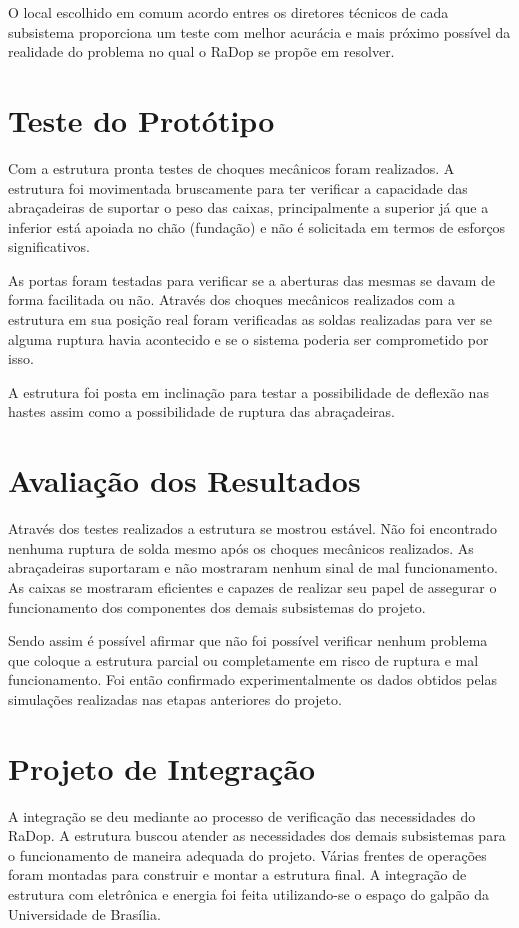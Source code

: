 O local escolhido em comum acordo entres os diretores técnicos de cada subsistema proporciona um teste com melhor acurácia e mais próximo possível da realidade do problema no qual o RaDop se propõe em resolver. 


\section{Teste do Protótipo}

Com a estrutura pronta testes de choques mecânicos foram realizados. A estrutura foi movimentada bruscamente para ter verificar a capacidade das abraçadeiras de suportar o peso das caixas, principalmente a superior já que a inferior está apoiada no chão (fundação) e não é solicitada em termos de esforços significativos.

As portas foram testadas para verificar se a aberturas das mesmas se davam de forma facilitada ou não. Através dos choques mecânicos realizados com a estrutura em sua posição real foram verificadas as soldas realizadas para ver se alguma ruptura havia acontecido e se o sistema poderia ser comprometido por isso.

A estrutura foi posta em inclinação para testar a possibilidade de deflexão nas hastes assim como a possibilidade de ruptura das abraçadeiras.

\section{Avaliação dos Resultados}

Através dos testes realizados a estrutura se mostrou estável. Não foi encontrado nenhuma ruptura de solda mesmo após os choques mecânicos realizados. As abraçadeiras suportaram e não mostraram nenhum sinal de mal funcionamento. As caixas se mostraram eficientes e capazes de realizar seu papel de assegurar o funcionamento dos componentes dos demais subsistemas do projeto.

Sendo assim é possível afirmar que não foi possível verificar nenhum problema que coloque a estrutura parcial ou completamente em risco de ruptura e mal funcionamento. Foi então confirmado experimentalmente os dados obtidos pelas simulações realizadas nas etapas anteriores do projeto.

\section{Projeto de Integração}

A integração se deu mediante ao processo de verificação das necessidades do RaDop. A estrutura buscou atender as necessidades dos demais subsistemas para o funcionamento de maneira adequada do projeto. Várias frentes de operações foram montadas para construir e montar a estrutura final. A integração de estrutura com eletrônica e energia foi feita utilizando-se o espaço do galpão da Universidade de Brasília.


